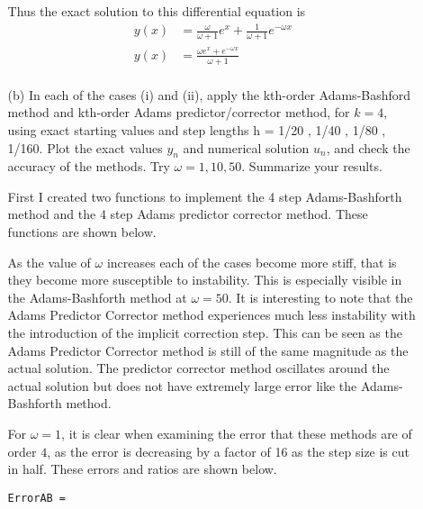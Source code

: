 \documentclass[11pt]{article}
\begin{document}
\begin{enumerate}
\begin{enumerate}
                Thus the exact solution to this differential equation is
                \begin{align*}
                    y(x) &= \frac{\omega}{\omega + 1} e^{x} + \frac{1}{\omega + 1}e^{-\omega x} \\
                    y(x) &= \frac{\omega e^x + e^{-\omega x}}{\omega + 1}\\
                \end{align*}

            \item[(b)]
                In each of the cases (i) and (ii), apply the kth-order Adams-Bashford method and
                kth-order Adams predictor/corrector method, for $k = 4$, using exact starting values and
                step lengths h = 1/20 , 1/40 , 1/80 , 1/160. 
                Plot the exact values $y_n$ and numerical solution $u_n$, and 
                check the accuracy of the methods.
                Try $\omega = 1, 10, 50$.
                Summarize your results.

                First I created two functions to implement the
                4 step Adams-Bashforth method and the 4 step Adams predictor corrector
                method.
                These functions are shown below.
                
                

                As the value of $\omega$ increases each of the cases become
                more stiff, that is they become more susceptible to instability.
                This is especially visible in the Adams-Bashforth method at $\omega = 50$.
                It is interesting to note that the Adams Predictor Corrector method
                experiences much less instability with the introduction of the
                implicit correction step.
                This can be seen as the Adams Predictor Corrector method
                is still of the same magnitude as the actual solution.
                The predictor corrector method oscillates around the actual solution
                but does not have extremely large error like the
                Adams-Bashforth method.

                For $\omega = 1$, it is clear when examining the error that these
                methods are of order $4$, as the error is decreasing by a
                factor of 16 as the step size is cut in half.
                These errors and ratios are shown below.
                \begin{verbatim}
ErrorAB =


\end{verbatim}
\end{enumerate}
\end{enumerate}
\end{document}
